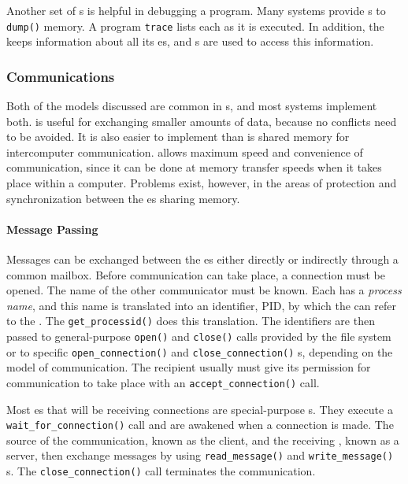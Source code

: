 Another set of s is helpful in debugging a program.
Many systems provide s to \texttt{dump()} memory.
A program \texttt{trace} lists each  as it is executed.
In addition, the  keeps information about all its es, and s are used to access this information.

\subsubsection{Communications}\label{subsubsec:Communications}
Both of the models discussed are common in s, and most systems implement both.
 is useful for exchanging smaller amounts of data, because no conflicts need to be avoided.
It is also easier to implement than is shared memory for intercomputer communication.
 allows maximum speed and convenience of communication, since it can be done at memory transfer speeds when it takes place within a computer.
Problems exist, however, in the areas of protection and synchronization between the es sharing memory.

\paragraph{Message Passing}\label{par:Message_Passing}
Messages can be exchanged between the es either directly or indirectly through a common mailbox.
Before communication can take place, a connection must be opened.
The name of the other communicator must be known.
Each  has a \emph{process name}, and this name is translated into an identifier, PID, by which the  can refer to the .
The \texttt{get_processid()}  does this translation.
The identifiers are then passed to general-purpose \texttt{open()} and \texttt{close()} calls provided by the file system or to specific \texttt{open_connection()} and \texttt{close_connection()} s, depending on the model of communication.
The recipient  usually must give its permission for communication to take place with an \texttt{accept_connection()} call.

Most es that will be receiving connections are special-purpose s.
They execute a \texttt{wait_for_connection()} call and are awakened when a connection is made.
The source of the communication, known as the client, and the receiving , known as a server, then exchange messages by using \texttt{read_message()} and \texttt{write_message()} s.
The \texttt{close_connection()} call terminates the communication.

